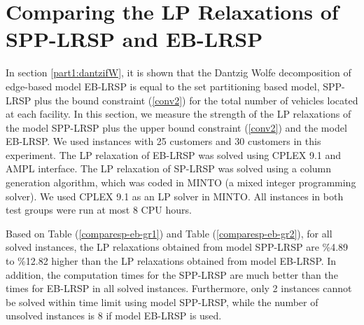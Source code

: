 \section{Comparing the LP Relaxations of SPP-LRSP and EB-LRSP}
In section \ref{part1:dantzifW}, it is shown that the Dantzig Wolfe 
decomposition of edge-based model EB-LRSP is equal to the set 
partitioning based model, SPP-LRSP plus the bound 
constraint (\ref{conv2}) for the total number of vehicles 
located at each facility. In this section, we measure the strength 
of the LP relaxations of the model SPP-LRSP plus the upper bound constraint 
(\ref{conv2}) and the model EB-LRSP.   
We used instances with 25 customers and 30 customers in this experiment.
The LP relaxation of EB-LRSP was solved using CPLEX 9.1 and AMPL 
interface. The LP relaxation of SP-LRSP was solved using 
a column generation algorithm, which was coded in MINTO
(a mixed integer programming solver). We used CPLEX 9.1
as an LP solver in MINTO. All instances in both test groups 
were run at most 8 CPU hours.   

Based on Table (\ref{comparesp-eb-gr1}) and Table (\ref{comparesp-eb-gr2}), 
for all solved instances, the LP relaxations obtained from model SPP-LRSP are \%4.89 to 
\%12.82 higher than the LP relaxations obtained from model EB-LRSP.   
In addition, the computation times for the SPP-LRSP are much better than the times 
for EB-LRSP in all solved instances. Furthermore, only 2 instances cannot be
solved within time limit using model SPP-LRSP, while the number of unsolved instances
is 8 if model EB-LRSP is used. 

